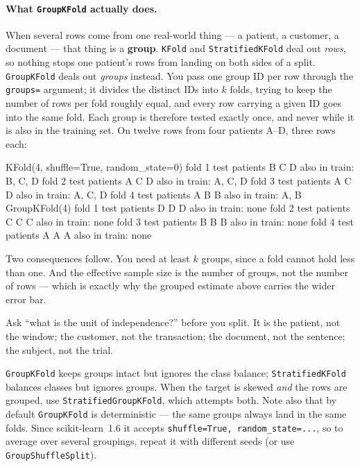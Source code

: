 \documentclass[11pt]{article}
\begin{document}
\paragraph{What \texttt{GroupKFold} actually does.} When several rows come from
one real-world thing --- a patient, a customer, a document --- that thing is
a \textbf{group}. \texttt{KFold} and \texttt{StratifiedKFold} deal out
\emph{rows}, so nothing stops one patient's rows from landing on both sides
of a split. \texttt{GroupKFold} deals out \emph{groups} instead. You pass one
group ID per row through the \texttt{groups=} argument; it divides the
distinct IDs into $k$ folds, trying to keep the number of rows per fold
roughly equal, and every row carrying a given ID goes into the same fold.
Each group is therefore tested exactly once, and never while it is also in
the training set. On twelve rows from four patients A--D, three rows each:
\begin{codeout}
   KFold(4, shuffle=True, random_state=0)
      fold 1  test patients B C D   also in train: B, C, D
      fold 2  test patients A C D   also in train: A, C, D
      fold 3  test patients A C D   also in train: A, C, D
      fold 4  test patients A B B   also in train: A, B
   GroupKFold(4)
      fold 1  test patients D D D   also in train: none
      fold 2  test patients C C C   also in train: none
      fold 3  test patients B B B   also in train: none
      fold 4  test patients A A A   also in train: none
\end{codeout}
Two consequences follow. You need at least $k$ groups, since a fold cannot
hold less than one. And the effective sample size is the number of groups,
not the number of rows --- which is exactly why the grouped estimate above
carries the wider error bar.

\begin{keyidea}
Ask ``what is the unit of independence?'' before you split. It is the patient,
not the window; the customer, not the transaction; the document, not the
sentence; the subject, not the trial.
\end{keyidea}

\begin{caution}
\texttt{GroupKFold} keeps groups intact but ignores the class balance;
\texttt{StratifiedKFold} balances classes but ignores groups. When the target
is skewed \emph{and} the rows are grouped, use \texttt{StratifiedGroupKFold},
which attempts both. Note also that by default \texttt{GroupKFold} is
deterministic --- the same groups always land in the same folds. Since
scikit-learn~1.6 it accepts \texttt{shuffle=True, random\_state=...}, so to
average over several groupings, repeat it with different seeds (or use
\texttt{GroupShuffleSplit}).
\end{caution}
\end{document}
